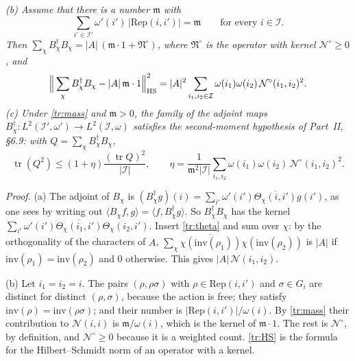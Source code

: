 \documentclass[11pt,letterpaper]{article}
\begin{document}
\emph{\textup{(b)} Assume that there is a number $\mathfrak m$ with}
\begin{equation}\label{tr:mass}
 \sum_{i'\in\mathcal I'}\omega'(i')\,|\mathrm{Rep}(i,i')|=\mathfrak m\qquad\text{for every }i\in\mathcal I.
\end{equation}
\emph{Then $\sum_\chi B_\chi^\dagger B_\chi=|A|\,(\mathfrak m\cdot1+\mathfrak N^{\circ})$, where $\mathfrak N^{\circ}$ is the
operator with kernel $\mathcal N^\circ\ge0$, and}
\begin{equation}\label{tr:HS}
 \Big\|\sum_\chi B_\chi^\dagger B_\chi-|A|\,\mathfrak m\cdot1\Big\|_{\rm HS}^2=|A|^2\sum_{i_1,i_2\in\mathcal I}\omega(i_1)\omega(i_2)\,\mathcal N^{\circ}(i_1,i_2)^2 .
\end{equation}
\emph{\textup{(c)} Under \eqref{tr:mass} and $\mathfrak m>0$, the family of the adjoint maps
$B_\chi^\dagger:L^2(\mathcal I',\omega')\to L^2(\mathcal I,\omega)$ satisfies the second-moment hypothesis of
Part~II, \S6.9: with $Q=\sum_\chi B_\chi^\dagger B_\chi$,}
\begin{equation}\label{tr:eta}
 \operatorname{tr}(Q^2)\le(1+\eta)\frac{(\operatorname{tr}Q)^2}{|\mathcal I|},\qquad
 \eta=\frac1{\mathfrak m^2|\mathcal I|}\sum_{i_1,i_2}\omega(i_1)\omega(i_2)\,\mathcal N^{\circ}(i_1,i_2)^2 .
\end{equation}

\emph{Proof.} (a) The adjoint of $B_\chi$ is
$(B_\chi^\dagger g)(i)=\sum_{i'}\omega'(i')\overline{\Theta_\chi(i,i')}g(i')$, as one sees by writing out
$\langle B_\chi f,g\rangle=\langle f,B_\chi^\dagger g\rangle$. So $B_\chi^\dagger B_\chi$ has the kernel
$\sum_{i'}\omega'(i')\overline{\Theta_\chi(i_1,i')}\Theta_\chi(i_2,i')$. Insert \eqref{tr:theta} and sum over $\chi$:
by the orthogonality of the characters of $A$,
$\sum_\chi\overline{\chi(\mathrm{inv}(\rho_1))}\chi(\mathrm{inv}(\rho_2))$ is $|A|$ if
$\mathrm{inv}(\rho_1)=\mathrm{inv}(\rho_2)$ and $0$ otherwise. This gives $|A|\,\mathcal N(i_1,i_2)$.

(b) Let $i_1=i_2=i$. The pairs $(\rho,\rho\sigma)$ with $\rho\in\mathrm{Rep}(i,i')$ and $\sigma\in G_i$ are
distinct for distinct $(\rho,\sigma)$, because the action is free; they satisfy
$\mathrm{inv}(\rho)=\mathrm{inv}(\rho\sigma)$; and their number is $|\mathrm{Rep}(i,i')|/\omega(i)$. By
\eqref{tr:mass} their contribution to $\mathcal N(i,i)$ is $\mathfrak m/\omega(i)$, which is the kernel of
$\mathfrak m\cdot1$. The rest is $\mathcal N^\circ$, by definition, and $\mathcal N^\circ\ge0$ because it is a
weighted count. \eqref{tr:HS} is the formula for the Hilbert--Schmidt norm of an operator with a kernel.
\end{document}
